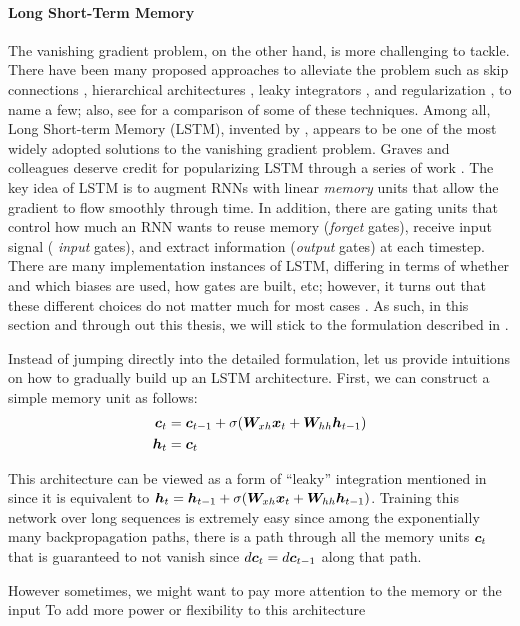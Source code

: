 \paragraph{Long Short-Term Memory}
The vanishing gradient problem, on the other hand, is more challenging to
tackle. There have been many proposed approaches to alleviate the problem such
as skip connections \cite{waibel90,lin96}, hierarchical
architectures \cite{el96}, leaky integrators \cite{Jaeger2007}, and
regularization \cite{pascanu13}, to name a few; also, see \cite{bengio13} for a
comparison of some of these techniques. Among all, Long Short-term
Memory (LSTM), invented by , appears to be one of the most
widely adopted solutions to the vanishing gradient problem.
Graves and colleagues deserve credit for popularizing LSTM through a series of
work \cite{graves05,graves09,graves13c}. 
The key idea of LSTM
is to augment RNNs with linear {\it memory} units that allow the gradient to
flow smoothly through time. In addition, there are gating units that control how
much an RNN wants to reuse memory ({\it forget} gates), receive input signal ({\it
input} gates), and extract information ({\it output} gates) at each timestep.
There are many implementation instances of LSTM, differing in terms of
whether and which biases are used, how gates are built, etc; however, it turns
out that these different choices do not matter much for most cases
\cite{jozefowicz15,greff15}. As such, in this section and through out this
thesis, we will stick to the formulation described in \cite{zaremba14}.

Instead of jumping directly into the detailed formulation, let us provide intuitions
on how to gradually build up an LSTM architecture. First, we can construct a
simple memory unit as follows:
\begin{align}
\bm{c}_{t} &= \bm{c}_{t-1} + \sigma(\bm{W}_{xh}\bm{x}_{t} + \bm{W}_{hh}\bm{h}_{t-1}
\label{e:simple_mem}) \\
\bm{h}_{t} &= \bm{c}_{t}
\end{align}

This architecture can be viewed as a form of ``leaky'' integration 
mentioned in \cite{sutskever12,bengio13} since it is equivalent to $\bm{h}_{t} =
\bm{h}_{t-1} + \sigma(\bm{W}_{xh}\bm{x}_{t} + \bm{W}_{hh}\bm{h}_{t-1})$. Training this
network over long sequences is extremely easy since among the exponentially many backpropagation
paths, there is a path through all the memory units $\bm{c}_{t}$ that is
guaranteed to not vanish since $d\bm{c}_{t} = d\bm{c}_{t-1}$ along that path. 

However sometimes, we might want to pay more attention to the memory or the
input
To add more power or flexibility to this architecture


